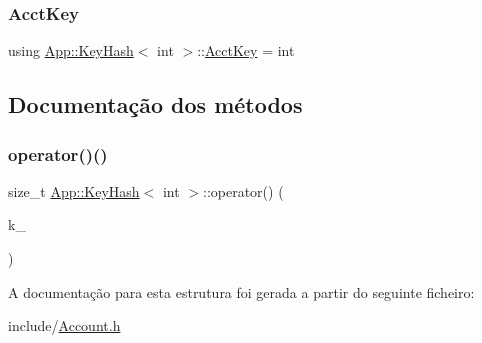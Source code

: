\subsubsection{\texorpdfstring{Acct\+Key}{AcctKey}}
{\footnotesize\ttfamily using \hyperlink{structApp_1_1KeyHash}{App\+::\+Key\+Hash}$<$ int $>$\+::\hyperlink{structApp_1_1KeyHash_3_01int_01_4_a337642864b44481d75807a3d2238e9ab}{Acct\+Key} =  int}



\subsection{Documentação dos métodos}
\mbox{\label{structApp_1_1KeyHash_3_01int_01_4_a5661fe92b7971bad40c9dae1cf550b7c}} 
\subsubsection{\texorpdfstring{operator()()}{operator()()}}
{\footnotesize\ttfamily size\+\_\+t \hyperlink{structApp_1_1KeyHash}{App\+::\+Key\+Hash}$<$ int $>$\+::operator() (\begin{DoxyParamCaption}\item[{const \hyperlink{structApp_1_1KeyHash_3_01int_01_4_a337642864b44481d75807a3d2238e9ab}{Acct\+Key} \&}]{k\+\_\+ }\end{DoxyParamCaption})\hspace{0.3cm}{\ttfamily [inline]}}



A documentação para esta estrutura foi gerada a partir do seguinte ficheiro\+:\begin{DoxyCompactItemize}
\item 
include/\hyperlink{Account_8h}{Account.\+h}\end{DoxyCompactItemize}
